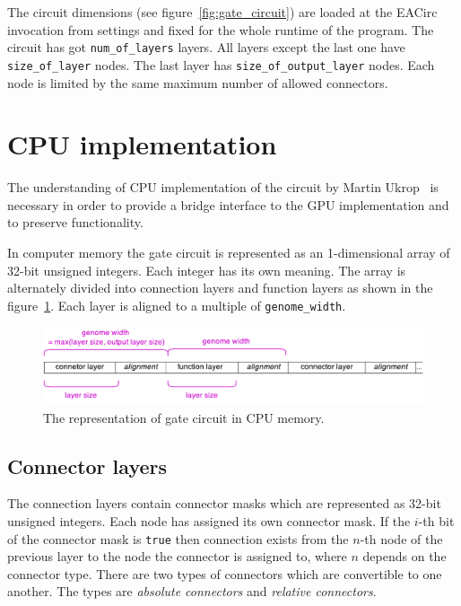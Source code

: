 \documentclass[12pt,oneside]{fithesis2}
\begin{document}
The circuit dimensions (see figure~\ref{fig:gate_circuit}) are loaded at the EACirc invocation from settings and fixed for the whole runtime of the program. The circuit has got \texttt{num\_of\_layers} layers. All layers except the last one have \texttt{size\_of\_layer} nodes. The last layer has \texttt{size\_of\_output\_layer} nodes. Each node is limited by the same maximum number of allowed connectors.


\section{CPU implementation}
\label{cpu_implementation}

The understanding of CPU implementation of the circuit by Martin Ukrop~\cite{ukrop_thesis} is necessary in order to provide a bridge interface to the GPU implementation and to preserve functionality.

In computer memory the gate circuit is represented as an 1-dimensional array of 32-bit unsigned integers. Each integer has its own meaning. The array is alternately divided into connection layers and function layers as shown in the figure~\ref{fig:circuit_cpu_array}. Each layer is aligned to a multiple of \texttt{genome\_width}.

\begin{figure}[h]
	\centering
	\includegraphics[width=\textwidth]{figures/cpu_genome.pdf}
	\caption{The representation of gate circuit in CPU memory.}
	\label{fig:circuit_cpu_array}
\end{figure}

\subsection{Connector layers}

The connection layers contain connector masks which are represented as 32-bit unsigned integers. Each node has assigned its own connector mask. If the $i$-th bit of the connector mask is \texttt{true} then connection exists from the $n$-th node of the previous layer to the node the connector is assigned to, where $n$ depends on the connector type. There are two types of connectors which are convertible to one another. The types are \emph{absolute connectors} and \emph{relative connectors}.
\end{document}
